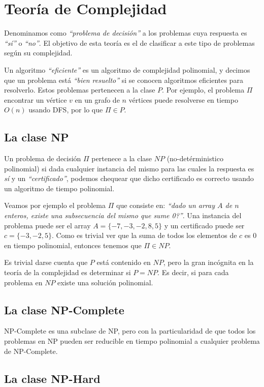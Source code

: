\newpage
\section{Teor\'ia de Complejidad}

Denominamos como \emph{``problema de decisi\'on''} a los problemas cuya respuesta es \emph{``s\'i''} o \emph{``no''}. El objetivo de esta teor\'ia es el de clasificar a este tipo de problemas seg\'un su complejidad.

Un algoritmo \emph{``eficiente''} es un algoritmo de complejidad polinomial, y decimos que un problema est\'a \emph{``bien resuelto''} si se conocen algoritmos eficientes para resolverlo. Estos problemas pertenecen a la clase $P$. Por ejemplo, el problema $\Pi$ encontrar un v\'ertice $v$ en un grafo de $n$ v\'ertices puede resolverse en tiempo $O(n)$ usando DFS, por lo que $\Pi \in P$.

\subsection{La clase NP}

Un problema de decisi\'on $\Pi$ pertenece a la clase $NP$ (no-det\'erministico polinomial) si dada cualquier instancia del mismo para las cuales la respuesta es \emph{s\'i} y un \emph{``certificado''}, podemos chequear que dicho certificado es correcto usando un algoritmo de tiempo polinomial.

Veamos por ejemplo el problema $\Pi$ que consiste en: \emph{``dado un array $A$ de $n$ enteros, existe una subsecuencia del mismo que sume 0?''}. Una instancia del problema puede ser el array $A = \{-7, -3, -2, 8, 5\}$ y un certificado puede ser $c = \{-3, -2, 5\}$. Como es trivial ver que la suma de todos los elementos de $c$ es $0$ en tiempo polinomial, entonces tenemos que $\Pi \in NP$.

Es trivial darse cuenta que $P$ est\'a contenido en $NP$, pero la gran inc\'ognita en la teor\'ia de la complejidad es determinar si $P = NP$. Es decir, si para cada problema en $NP$ existe una soluci\'on polinomial.

\subsection{La clase NP-Complete}

NP-Complete es una subclase de NP, pero con la particularidad de que todos los problemas en NP pueden ser reducible en tiempo polinomial a cualquier problema de NP-Complete.

\subsection{La clase NP-Hard}


